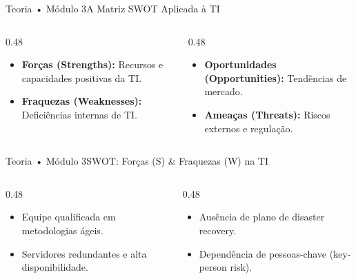 \begin{senaiframe}{Teoria • Módulo 3}{A Matriz SWOT Aplicada à TI}
  \begin{columns}[t]
    \begin{column}{0.48\textwidth}
      \begin{tcolorbox}[senaibluecard, title={Fatores Internos (Sob Controle)}]
        \begin{itemize}
          \item \textbf{Forças (Strengths):} Recursos e capacidades positivas da TI.
          \item \textbf{Fraquezas (Weaknesses):} Deficiências internas de TI.
        \end{itemize}
      \end{tcolorbox}
    \end{column}
    \begin{column}{0.48\textwidth}
      \begin{tcolorbox}[senaiambercard, title={Fatores Externos (Fora do Controle)}]
        \begin{itemize}
          \item \textbf{Oportunidades (Opportunities):} Tendências de mercado.
          \item \textbf{Ameaças (Threats):} Riscos externos e regulação.
        \end{itemize}
      \end{tcolorbox}
    \end{column}
  \end{columns}
\end{senaiframe}

\begin{senaiframe}{Teoria • Módulo 3}{SWOT: Forças (S) \& Fraquezas (W) na TI}
  \begin{columns}[t]
    \begin{column}{0.48\textwidth}
      \begin{tcolorbox}[senaigreencard, title={Exemplos de Forças (S)}]
        \begin{itemize}
          \item Equipe qualificada em metodologias ágeis.
          \item Servidores redundantes e alta disponibilidade.
        \end{itemize}
      \end{tcolorbox}
    \end{column}
    \begin{column}{0.48\textwidth}
      \begin{tcolorbox}[senairedcard, title={Exemplos de Fraquezas (W)}]
        \begin{itemize}
          \item Ausência de plano de disaster recovery.
          \item Dependência de pessoas-chave (key-person risk).
        \end{itemize}
      \end{tcolorbox}
    \end{column}
  \end{columns}
\end{senaiframe}

